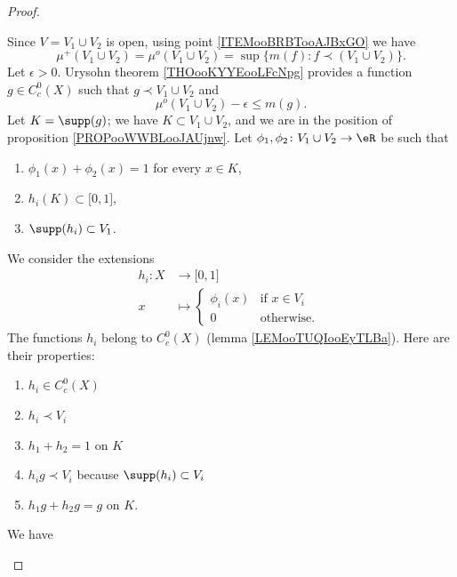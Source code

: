 \begin{proof}
\begin{subproof}
		Since \(V= V_1\cup V_2\) is open, using point \ref{ITEMooBRBTooAJBxGO} we have
		\begin{equation}
			\mu^+(V_1\cup V_2)=\mu^o(V_1\cup V_2)=\sup\{ m(f):f\prec (V_1\cup V_2) \}.
		\end{equation}
		Let \( \epsilon>0\). Urysohn theorem \ref{THOooKYYEooLFcNpg} provides a function \( g\in C^0_c(X)\) such that \( g\prec V_1\cup V_2\) and
		\begin{equation}        \label{LEMooFYAAooDaOYUy}
			\mu^o(V_1\cup V_2)-\epsilon\leq m(g).
		\end{equation}
		Let \( K=\supp(g)\); we have \( K\subset V_1\cup V_2\), and we are in the position of proposition \ref{PROPooWWBLooJAUjnw}. Let \(\phi_1,\phi_2 \colon V_1\cup V_2\to \eR  \) be such that
		\begin{enumerate}
			\item
			      \( \phi_1(x)+\phi_2(x)=1\) for every \( x\in K\),
			\item
			      \( h_i(K)\subset\mathopen[ 0,1\mathclose]\),
			\item
			      \( \supp(h_i)\subset V_1\).
		\end{enumerate}
		We consider the extensions
		\begin{equation}
			\begin{aligned}
				h_i\colon X & \to \mathopen[ 0 , 1 \mathclose]        \\
				x           & \mapsto \begin{cases}
					                      \phi_i(x) & \text{if } x\in V_i \\
					                      0         & \text{otherwise. }
				                      \end{cases}
			\end{aligned}
		\end{equation}
		The functions \( h_i\) belong to \( C^0_c(X)\) (lemma \ref{LEMooTUQIooEyTLBa}). Here are their properties:
		\begin{enumerate}
			\item
			      \( h_i\in C^0_c(X)\)
			\item
			      \( h_i\prec V_i\)
			\item
			      \( h_1+h_2=1\) on \( K\)
			\item
			      \( h_ig\prec V_i\) because \( \supp(h_i)\subset V_i\)
			\item
			      \( h_1g+h_2g=g\) on \( K \).
		\end{enumerate}
		We have
		\begin{equation}

\end{equation}
\end{subproof}
\end{proof}
